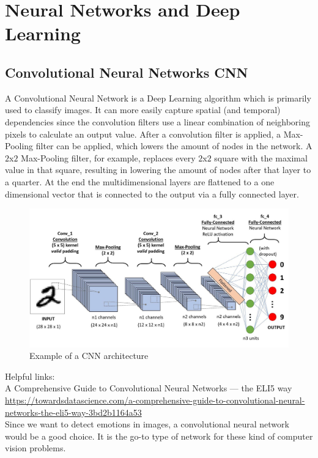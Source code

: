 \section{Neural Networks and Deep Learning}


\subsection{Convolutional Neural Networks CNN}

A Convolutional Neural Network is a Deep Learning algorithm which is primarily used to classify images. It can more easily capture spatial (and temporal) dependencies since the convolution filters use a linear combination of neighboring pixels to calculate an output value. After a convolution filter is applied, a Max-Pooling filter can be applied, which lowers the amount of nodes in the network. A $2$x$2$ Max-Pooling filter, for example, replaces every $2$x$2$ square with the maximal value in that square, resulting in lowering the amount of nodes after that layer to a quarter.
At the end the multidimensional layers are flattened to a one dimensional vector that is connected to the output via a fully connected layer.

\begin{figure}[hbtp]
	\centering
	\includegraphics[width=1\textwidth]{Images/CNN}
	\caption{Example of a CNN architecture}
\end{figure}

Helpful links:\\
A Comprehensive Guide to Convolutional Neural Networks — the ELI5 way
\\
\url{https://towardsdatascience.com/a-comprehensive-guide-to-convolutional-neural-networks-the-eli5-way-3bd2b1164a53}
\\

Since we want to detect emotions in images, a convolutional neural network would be a good choice. It is the go-to type of network for these kind of computer vision problems.

